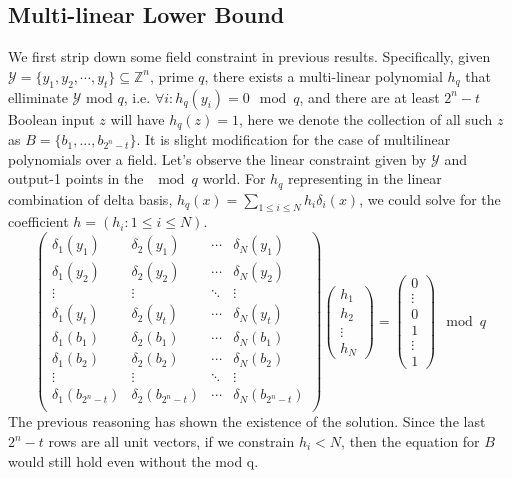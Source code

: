 \documentclass{article}
\begin{document}
\subsection{Multi-linear Lower Bound}
We first strip down some field constraint in previous results. Specifically, given $\mathcal{Y}=\{y_1,y_2,\cdots,y_t\}\subseteq \mathbb{Z}^n$, prime $q$, there exists a multi-linear polynomial $h_q$ that elliminate $\mathcal{Y}$ mod $q$, i.e. $\forall i:h_q(y_i)=0\mod q$, and there are at least $2^n-t$ Boolean input $z$ will have $h_q(z)=1$, here we denote the collection of all such $z$ as $B=\{b_1,...,b_{2^n-t}\}$. It is slight modification for the case of multilinear polynomials over a field. Let's observe the linear constraint given by $\mathcal{Y}$ and output-1 points in the $\mod q$ world. For $h_q$ representing in the linear combination of delta basis, $h_q(x) = \sum_{1\leq i\leq N}h_i\delta_i(x)$, we could solve for the coefficient $h=(h_i: 1\leq i\leq N)$.
$$
\begin{pmatrix}
\delta_1(y_1)&\delta_2(y_1)&\cdots&\delta_N(y_1)\\
\delta_1(y_2)&\delta_2(y_2)&\cdots&\delta_N(y_2)\\
\vdots&\vdots&\ddots&\vdots\\
\delta_1(y_t)&\delta_2(y_t)&\cdots&\delta_N(y_t)\\
\delta_1(b_1)&\delta_2(b_1)&\cdots&\delta_N(b_1)\\
\delta_1(b_2)&\delta_2(b_2)&\cdots&\delta_N(b_2)\\
\vdots&\vdots&\ddots&\vdots\\
\delta_1(b_{2^n-t})&\delta_2(b_{2^n-t})&\cdots&\delta_N(b_{2^n-t})\\
\end{pmatrix}
\begin{pmatrix}
h_1\\h_2\\\vdots\\h_N
\end{pmatrix}
=
\begin{pmatrix}
0\\\vdots\\0\\1\\\vdots\\1
\end{pmatrix}
\mod q
$$
The previous reasoning has shown the existence of the solution. Since the last $2^n-t$ rows are all unit vectors, if we constrain $h_i<N$, then the equation for $B$ would still hold even without the mod q.
\end{document}
